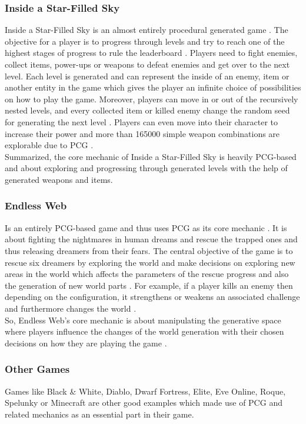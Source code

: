 \documentclass[MGS,Master,english]{twbook}%
\begin{document}
\subsubsection{Inside a Star-Filled Sky}
Inside a Star-Filled Sky is an almost entirely procedural generated game \cite{game::insideAStarFilledSky}. The objective for a player is to progress through levels and try to reach one of the highest stages of progress to rule the leaderboard \cite{game::insideAStarFilledSky}. Players need to fight enemies, collect items, power-ups or weapons to defeat enemies and get over to the next level. Each level is generated and can represent the inside of an enemy, item or another entity in the game which gives the player an infinite choice of possibilities on how to play the game. Moreover, players can move in or out of the recursively nested levels, and every collected item or killed enemy change the random seed for generating the next level \cite{pcg::endlessWeb}. Players can even move into their character to increase their power and more than 165000 simple weapon combinations are explorable due to PCG \cite{game::insideAStarFilledSky}.\\
Summarized, the core mechanic of Inside a Star-Filled Sky is heavily PCG-based and about exploring and progressing through generated levels with the help of generated weapons and items.

\subsubsection{Endless Web}
Is an entirely PCG-based game and thus uses PCG as its core mechanic \cite{pcg::endlessWeb}. It is about fighting the nightmares in human dreams and rescue the trapped ones and thus releasing dreamers from their fears. The central objective of the game is to rescue six dreamers by exploring the world and make decisions on exploring new areas in the world which affects the parameters of the rescue progress and also the generation of new world parts \cite{pcg::endlessWeb}. For example, if a player kills an enemy then depending on the configuration, it strengthens or weakens an associated challenge and furthermore changes the world \cite{pcg::endlessWeb}.\\
So, Endless Web's core mechanic is about manipulating the generative space where players influence the changes of the world generation with their chosen decisions on how they are playing the game \cite{pcg::endlessWeb}.

\subsubsection{Other Games}
Games like Black \& White, Diablo, Dwarf Fortress, Elite, Eve Online, Roque, Spelunky or Minecraft are other good examples which made use of PCG and related mechanics as an essential part in their game.
\end{document}
